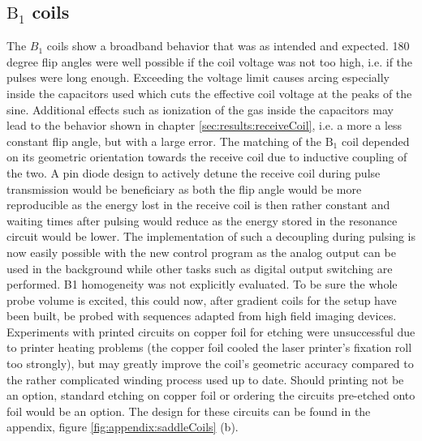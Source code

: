         \subsection{$\mathrm{B}_1$ coils}
        The $B_1$ coils show a broadband behavior that was as intended and expected. 180 degree flip angles were well possible if the coil voltage was not too high, i.e. if the pulses were long enough. Exceeding the voltage limit causes arcing especially inside the capacitors used which cuts the effective coil voltage at the peaks of the sine. Additional effects such as ionization of the gas inside the capacitors may lead to the behavior shown in chapter \ref{sec:results:receiveCoil}, i.e. a more a less constant flip angle, but with a large error.
            The matching of the $\mathrm{B_1}$ coil depended on its geometric orientation towards the receive coil due to inductive coupling of the two. A pin diode design to actively detune the receive coil during pulse transmission would be beneficiary as both the flip angle would be more reproducible as the energy lost in the receive coil is then rather constant and waiting times after pulsing would reduce as the energy stored in the resonance circuit would be lower. The implementation of such a decoupling during pulsing is now easily possible with the new control program as the analog output can be used in the background while other tasks such as digital output switching are performed.
            B1 homogeneity was not explicitly evaluated. To be sure the whole probe volume is excited, this could now, after gradient coils for the setup have been built, be probed with sequences adapted from high field imaging devices.
            Experiments with printed circuits on copper foil for etching were unsuccessful due to printer heating problems (the copper foil cooled the laser printer's fixation roll too strongly), but may greatly improve the coil's geometric accuracy compared to the rather complicated winding process used up to date. Should printing not be an option, standard etching on copper foil or ordering the circuits pre-etched onto foil would be an option.  The design for these circuits can be found in the appendix, figure \ref{fig:appendix:saddleCoils} (b).
